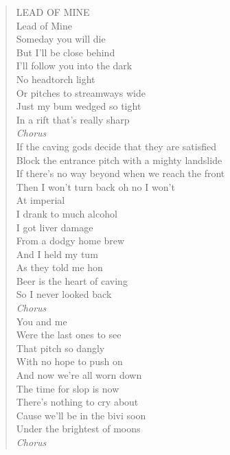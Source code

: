 \begin{verse} \centering
LEAD OF MINE \\
 \vspace{0.3cm}
Lead of Mine \\
Someday you will die \\
But I'll be close behind \\
I'll follow you into the dark \\
 \vspace{0.3cm}
No headtorch light \\
Or pitches to streamways wide \\
Just my bum wedged so tight \\
In a rift that's really sharp \\
  \vspace{0.3cm}
\textit{Chorus}\\
 \vspace{0.3cm}
If the caving gods decide that they are satisfied \\
Block the entrance pitch with a mighty landslide \\
If there's no way beyond when we reach the front \\
Then I won't turn back oh no I won't \\
  \vspace{0.3cm}
At imperial \\
I drank to much alcohol \\
I got liver damage \\
From a dodgy home brew \\ 
  \vspace{0.3cm}
And I held my tum \\
As they told me hon \\
Beer is the heart of caving \\
So I never looked back \\ 
  \vspace{0.3cm}
\textit{Chorus} \\ 
 \vspace{0.3cm}
You and me \\
Were the last ones to see \\
That pitch so dangly \\
With no hope to push on \\ 
  \vspace{0.3cm}
And now we're all worn down \\
The time for slop is now \\
There's nothing to cry about \\
Cause we'll be in the bivi soon \\
Under the brightest of moons \\ 
  \vspace{0.3cm}
\textit{Chorus} 

\end{verse}

